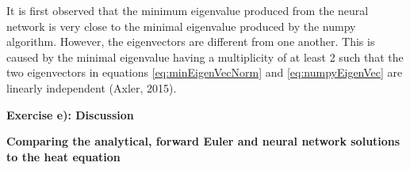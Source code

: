 \documentclass[12pt,a4paper]{article}
\begin{document}
\noindent It is first observed that the minimum eigenvalue produced from the neural network is very close to the minimal eigenvalue produced by the numpy algorithm. However, the eigenvectors are different from one another. This is caused by the minimal eigenvalue having a multiplicity of at least 2 such that the two eigenvectors in equations \ref{eq:minEigenVecNorm} and \ref{eq:numpyEigenVec} are linearly independent (Axler, 2015). 

\newpage

\begin{center}
\Large{\textbf{Exercise e): Discussion}}
\end{center}

\begin{center}
\large{\textbf{Comparing the analytical, forward Euler and neural network solutions to the heat equation}}
\end{center}
\end{document}
